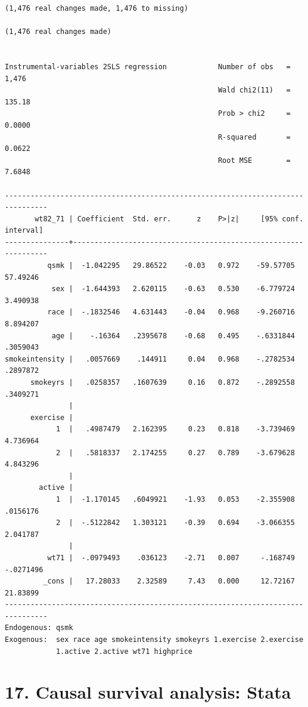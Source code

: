 \documentclass[
  10pt,
  a4paper,
]{book}
\begin{document}
\begin{verbatim}
(1,476 real changes made, 1,476 to missing)

(1,476 real changes made)


Instrumental-variables 2SLS regression            Number of obs   =      1,476
                                                  Wald chi2(11)   =     135.18
                                                  Prob > chi2     =     0.0000
                                                  R-squared       =     0.0622
                                                  Root MSE        =     7.6848

--------------------------------------------------------------------------------
       wt82_71 | Coefficient  Std. err.      z    P>|z|     [95% conf. interval]
---------------+----------------------------------------------------------------
          qsmk |  -1.042295   29.86522    -0.03   0.972    -59.57705    57.49246
           sex |  -1.644393   2.620115    -0.63   0.530    -6.779724    3.490938
          race |  -.1832546   4.631443    -0.04   0.968    -9.260716    8.894207
           age |    -.16364   .2395678    -0.68   0.495    -.6331844    .3059043
smokeintensity |   .0057669    .144911     0.04   0.968    -.2782534    .2897872
      smokeyrs |   .0258357   .1607639     0.16   0.872    -.2892558    .3409271
               |
      exercise |
            1  |   .4987479   2.162395     0.23   0.818    -3.739469    4.736964
            2  |   .5818337   2.174255     0.27   0.789    -3.679628    4.843296
               |
        active |
            1  |  -1.170145   .6049921    -1.93   0.053    -2.355908    .0156176
            2  |  -.5122842   1.303121    -0.39   0.694    -3.066355    2.041787
               |
          wt71 |  -.0979493    .036123    -2.71   0.007     -.168749   -.0271496
         _cons |   17.28033    2.32589     7.43   0.000     12.72167    21.83899
--------------------------------------------------------------------------------
Endogenous: qsmk
Exogenous:  sex race age smokeintensity smokeyrs 1.exercise 2.exercise
            1.active 2.active wt71 highprice
\end{verbatim}

\chapter*{17. Causal survival analysis: Stata}\label{causal-survival-analysis-stata}
\end{document}
